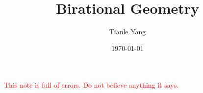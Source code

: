 \documentclass[sectionlevel=chapter]{noteformyself}
\title{Birational Geometry}
\author{Tianle Yang}
\date{\today}
\newcommand{\Yang}[1]{\textcolor{red}{#1}}
\begin{document}
    \maketitle

    \tableofcontents

    {\Large{\Yang{This note is full of errors. Do not believe anything it says.}}}

     

    


    

    \printbibliography[heading=bibintoc, title={References}]
\end{document}
